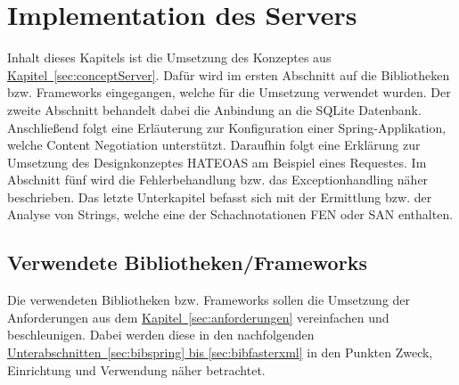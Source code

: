 
\chapter{Implementation des Servers}
Inhalt dieses Kapitels ist die Umsetzung des Konzeptes aus \hyperref[sec:conceptServer]{Kapitel~\ref{sec:conceptServer}}. Dafür wird im ersten Abschnitt auf die Bibliotheken bzw. Frameworks eingegangen, welche für die Umsetzung verwendet wurden. Der zweite Abschnitt behandelt dabei die Anbindung an die SQLite Datenbank. Anschließend folgt eine Erläuterung zur Konfiguration einer Spring-Applikation, welche Content Negotiation unterstützt. Daraufhin folgt eine Erklärung zur Umsetzung des Designkonzeptes HATEOAS am Beispiel eines Requestes. Im Abschnitt fünf wird die Fehlerbehandlung bzw. das Exceptionhandling näher beschrieben. Das letzte Unterkapitel befasst sich mit der Ermittlung bzw. der Analyse von Strings, welche eine der Schachnotationen \gls{FEN} oder \gls{SAN} enthalten.

\section{Verwendete Bibliotheken/Frameworks}
Die verwendeten Bibliotheken bzw. Frameworks sollen die Umsetzung der Anforderungen aus dem \hyperref[sec:anforderungen]{Kapitel~\ref{sec:anforderungen}} vereinfachen und beschleunigen. Dabei werden diese in den nachfolgenden \hyperref[sec:bibspring, sec:bibfasterxml]{Unterabschnitten~\ref{sec:bibspring} bis \ref{sec:bibfasterxml}} in den Punkten Zweck, Einrichtung und Verwendung näher betrachtet. 

